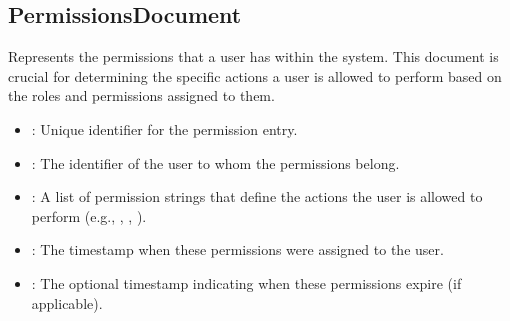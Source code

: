 \documentclass[letterpaper,10pt,english]{sphinxmanual}
\begin{document}
\subsection{PermissionsDocument}
\label{\detokenize{crm_system/authorization_service:permissionsdocument}}
\sphinxAtStartPar
Represents the permissions that a user has within the system. This document is crucial for determining the specific actions a user is allowed to perform based on the roles and permissions assigned to them.
\begin{itemize}
\item {} 
\sphinxAtStartPar
{}: 
\sphinxhyphen{} Unique identifier for the permission entry.

\item {} 
\sphinxAtStartPar
{}: 
\sphinxhyphen{} The identifier of the user to whom the permissions belong.

\item {} 
\sphinxAtStartPar
{}: 
\sphinxhyphen{} A list of permission strings that define the actions the user is allowed to perform (e.g., , , ).

\item {} 
\sphinxAtStartPar
{}: 
\sphinxhyphen{} The timestamp when these permissions were assigned to the user.

\item {} 
\sphinxAtStartPar
{}: 
\sphinxhyphen{} The optional timestamp indicating when these permissions expire (if applicable).

\end{itemize}

\sphinxstepscope
\end{document}
